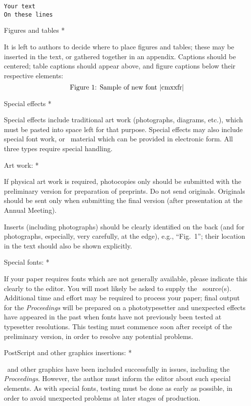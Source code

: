 \verbatim
{\small
\begin{verbatim}
Your text
On these lines
\end{verbatim}
}
\endverbatim
 
\subhead * Figures and tables *
 
It is left to authors to decide where to place figures and tables; these
may be inserted in the text, or gathered together in an appendix.
Captions should be centered; table captions should appear above, and
figure captions below their respective elements:
$$
   \hbox{Figure~1: Sample of new font |cmxxfr|}
$$
 
\subhead * Special effects *
 
Special effects include traditional art work (photographs, diagrams,
etc.), which must be pasted into space left for that purpose.  Special
effects may also include special font work, or \PS\ material which can
be provided in electronic form.  All three types require special
handling.
 
\subsubhead * Art work: *
 
If physical art work is required, photocopies only should be submitted
with the preliminary version for preparation of preprints.  Do not send
originals.  Originals should be sent only when submitting the final
version (after presentation at the Annual Meeting).
 
Inserts (including photographs) should be clear\-ly identified on the
back (and for photographs, especially, very carefully, at the edge),
e.g., ``Fig.~1''; their location in the text should also be shown
explicitly.
 
\subsubhead * Special fonts: *
 
If your paper requires fonts which are not generally available, please
indicate this clearly to the editor.  You will most likely be asked to
supply the \MF\ source(s).  Additional time and effort may be required
to process your paper; final output for the {\sl Proceedings\/} will be
prepared on a phototypesetter and unexpected effects have appeared in
the past when fonts have not previously been tested at typesetter
resolutions.  This testing must commence soon after receipt of the
preliminary version, in order to resolve any potential problems.
 
\subsubhead * PostScript and other graphics inser\-tions: *
 
\PS\ and other graphics have been included successfully in \TUB\/ issues,
including the {\sl Proceedings}.  However, the author must inform the
editor about such special elements.  As with special fonts, testing
must be done as early as possible, in order to avoid unexpected problems
at later stages of production.
 
